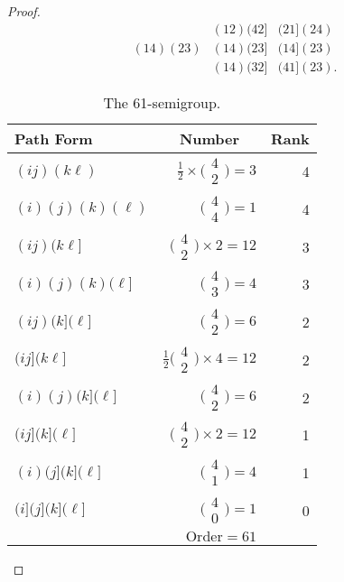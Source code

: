 \documentclass{surv-l}
\numberwithin{equation}{section}
\numberwithin{table}{section}
\numberwithin{figure}{section}
\theoremstyle{definition}
\begin{document}
\begin{proof}
\[\begin{matrix}
&(12)(42] &(21](24) \\
(14)(23) &(14)(23] &(14](23) \\
&(14)(32] &(41](23).
\end{matrix}
\]
\setcounter{table}{1}
\begin{table}[!h]
\caption{The 61-semigroup.\label{tab6.26.2}}
{\begin{tabular}{|lrr|}
\hline
\multicolumn{1}{|l}{\textbf{Path Form}} &\multicolumn{1}{c}{\textbf{Number}} &\multicolumn{1}{c|}{\textbf{Rank}} \\
\hline
$(ij)(k\ell)$ &$\frac{1}{2}\times \big(\!\begin{smallmatrix}4\\
2\end{smallmatrix}\!\big)=3$ &4 \\[3pt]
$(i)(j)(k)(\ell)$ &$\big(\!\begin{smallmatrix}
4\\
4\end{smallmatrix}\!\big)=1$ &4 \\
\hline
$(ij)(k\ell]$ &$\big(\!\begin{smallmatrix}4\\
2\end{smallmatrix}\!\big)\times 2=12$ &3 \\
$(i)(j)(k)(\ell]$ &$\big(\!\begin{smallmatrix}4\\
3\end{smallmatrix}\!\big)=4$ &3 \\
\hline
$(ij)(k](\ell]$ &$\big(\!\begin{smallmatrix}4\\
2\end{smallmatrix}\!\big)=6$ &2 \\
$(ij](k\ell]$ &$\frac{1}{2}\big(\!\begin{smallmatrix}4\\
2\end{smallmatrix}\!\big)\times 4=12$ &2 \\
$(i)(j)(k](\ell]$ &$\big(\!\begin{smallmatrix}4\\
2\end{smallmatrix}\!\big)=6$ &2 \\
\hline
$(ij](k](\ell]$ &$\big(\!\begin{smallmatrix}4\\
2\end{smallmatrix}\!\big)\times 2=12$ &1 \\
$(i)(j](k](\ell]$ &$\big(\!\begin{smallmatrix}
4\\ 1\end{smallmatrix}\!\big)=4$ &1 \\
\hline
$(i](j](k](\ell]$ &$\big(\!\begin{smallmatrix}4\\
0\end{smallmatrix}\!\big)=1$ &0 \\
\hline
&$\mathrm{Order} = 61$ & \\
\hline
\end{tabular}}{}
\end{table}


\end{proof}
\end{document}
